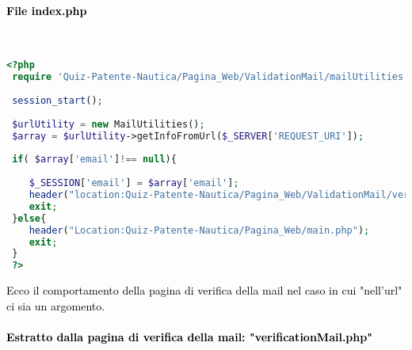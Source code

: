  \paragraph{\textcolor{black}{File index.php}}\leavevmode\\
  
 \begin{lstlisting}[language=php]
 <?php
 require 'Quiz-Patente-Nautica/Pagina_Web/ValidationMail/mailUtilities.php';
 
 session_start();
 
 $urlUtility = new MailUtilities();
 $array = $urlUtility->getInfoFromUrl($_SERVER['REQUEST_URI']);
 
 if( $array['email']!== null){	
 	
 	$_SESSION['email'] = $array['email'];
 	header("location:Quiz-Patente-Nautica/Pagina_Web/ValidationMail/verificationMail.php");
 	exit;
 }else{
 	header("Location:Quiz-Patente-Nautica/Pagina_Web/main.php");
 	exit;
 }
 ?>
 \end{lstlisting}
 
 \textcolor{black}{Ecco il comportamento della pagina di verifica della mail nel caso in cui "nell'url" ci sia un argomento.}\\
 
\paragraph{\textcolor{black}{Estratto dalla pagina di verifica della mail: "verificationMail.php"}}\leavevmode\\
 
